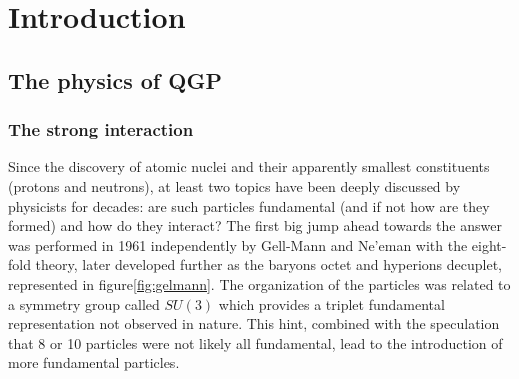 
\chapter{Introduction}  %





\section{The physics of QGP} %
\subsection{The strong interaction}
Since the discovery of atomic nuclei and their apparently smallest constituents (protons and neutrons), at least two topics have been deeply discussed by physicists for decades: are such particles fundamental (and if not how are they formed) and how do they interact?
The first big jump ahead towards the answer was performed in 1961 independently by Gell-Mann and Ne'eman with the eight-fold theory, later developed further as the baryons octet and hyperions decuplet, represented in figure\ref{fig:gelmann}.
The organization of the particles was related to a symmetry group called $SU(3)$ which provides a triplet fundamental representation not observed in nature.
This hint, combined with the speculation that 8 or 10 particles were not likely all fundamental, lead to the introduction of more fundamental particles.

